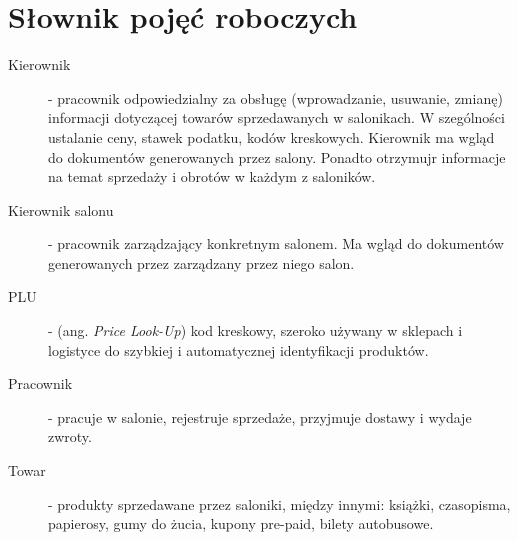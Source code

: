 \section{Słownik pojęć roboczych}
\begin{description}
\item[Kierownik] - pracownik odpowiedzialny za obsługę (wprowadzanie, usuwanie, zmianę) informacji dotyczącej towarów sprzedawanych w salonikach. W szególności ustalanie ceny, stawek podatku, kodów kreskowych. Kierownik ma wgląd do dokumentów generowanych przez salony. Ponadto otrzymujr informacje na temat sprzedaży i obrotów w każdym z saloników.
\item[Kierownik salonu] - pracownik zarządzający konkretnym salonem. Ma wgląd do dokumentów generowanych przez zarządzany przez niego salon.
\item[PLU] - (ang. \emph{Price Look-Up}) kod kreskowy, szeroko używany w sklepach i logistyce do szybkiej i automatycznej identyfikacji produktów.
\item[Pracownik] - pracuje w salonie, rejestruje sprzedaże, przyjmuje dostawy i wydaje zwroty.
\item[Towar] - produkty sprzedawane przez saloniki, między innymi: książki, czasopisma, papierosy, gumy do żucia, kupony pre-paid, bilety autobusowe.
\end{description}

